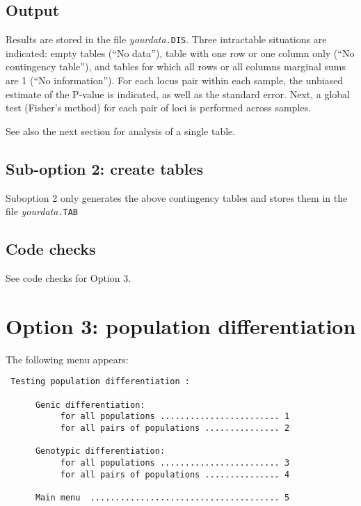 \documentclass[12pt,]{book}
\theoremstyle{definition}
\theoremstyle{definition}
\theoremstyle{definition}
\theoremstyle{remark}
\begin{document}
\subsection{Output}\label{output-1}

Results are stored in the file \emph{yourdata}\texttt{.DIS}. Three
intractable situations are indicated: empty tables (``No data''), table
with one row or one column only (``No contingency table''), and tables
for which all rows or all columns marginal sums are 1 (``No
information''). For each locus pair within each sample, the unbiased
estimate of the P-value is indicated, as well as the standard error.
Next, a global test (Fisher's method) for each pair of loci is performed
across samples.

See also the next section for analysis of a single table.

\subsection{Sub-option 2: create
tables}\label{sub-option-2-create-tables}

Suboption 2 only generates the above contingency tables and stores them
in the file \emph{yourdata}\texttt{.TAB}

\subsection{Code checks}\label{code-checks-1}

See code checks for Option 3.

\section{Option 3: population
differentiation}\label{option-3-population-differentiation}

The following menu appears:

\begin{verbatim}
 Testing population differentiation :

      Genic differentiation:
           for all populations ........................ 1
           for all pairs of populations ............... 2

      Genotypic differentiation:
           for all populations ........................ 3
           for all pairs of populations ............... 4

      Main menu  ...................................... 5
\end{verbatim}
\end{document}
